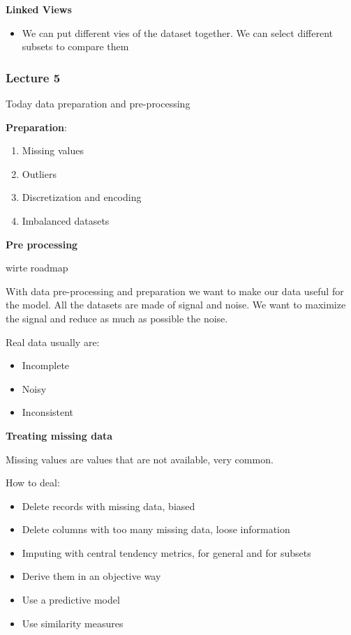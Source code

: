 \vspace{10pt}

\textbf{Linked Views}

\begin{itemize}
    \item We can put different vies of the dataset together. We can select different subsets to compare them
\end{itemize}

\subsubsection{Lecture 5}

Today data preparation and pre-processing

\textbf{Preparation}:
\begin{enumerate}
    \item Missing values
    \item Outliers
    \item Discretization and encoding
    \item Imbalanced datasets
\end{enumerate}

\textbf{Pre processing}

wirte roadmap


\vspace{10pt}

With data pre-processing and preparation we want to make our data useful for the model. All the datasets are made of signal and noise. We want to maximize the signal and reduce as much as possible the noise.

Real data usually are:
\begin{itemize}
    \item Incomplete
    \item Noisy
    \item Inconsistent
\end{itemize}

\textbf{Treating missing data}

Missing values are values that are not available, very common. 

How to deal:
\begin{itemize}
    \item Delete records with missing data, biased
    \item Delete columns with too many missing data, loose information
    \item Imputing with central tendency metrics, for general and for subsets
    \item Derive them in an objective way
    \item Use a predictive model
    \item Use similarity measures
    
\end{itemize}


